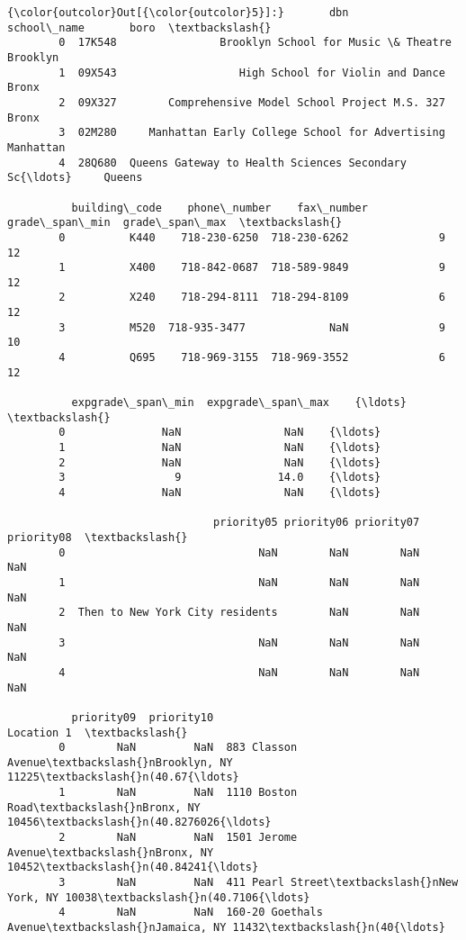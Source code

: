 \documentclass[11pt]{article}
\begin{document}
\begin{Verbatim}[commandchars=\\\{\}]
{\color{outcolor}Out[{\color{outcolor}5}]:}       dbn                                        school\_name       boro  \textbackslash{}
        0  17K548                Brooklyn School for Music \& Theatre   Brooklyn   
        1  09X543                   High School for Violin and Dance      Bronx   
        2  09X327        Comprehensive Model School Project M.S. 327      Bronx   
        3  02M280     Manhattan Early College School for Advertising  Manhattan   
        4  28Q680  Queens Gateway to Health Sciences Secondary Sc{\ldots}     Queens   
        
          building\_code    phone\_number    fax\_number grade\_span\_min  grade\_span\_max  \textbackslash{}
        0          K440    718-230-6250  718-230-6262              9              12   
        1          X400    718-842-0687  718-589-9849              9              12   
        2          X240    718-294-8111  718-294-8109              6              12   
        3          M520  718-935-3477             NaN              9              10   
        4          Q695    718-969-3155  718-969-3552              6              12   
        
          expgrade\_span\_min  expgrade\_span\_max    {\ldots}      \textbackslash{}
        0               NaN                NaN    {\ldots}       
        1               NaN                NaN    {\ldots}       
        2               NaN                NaN    {\ldots}       
        3                 9               14.0    {\ldots}       
        4               NaN                NaN    {\ldots}       
        
                                priority05 priority06 priority07 priority08  \textbackslash{}
        0                              NaN        NaN        NaN        NaN   
        1                              NaN        NaN        NaN        NaN   
        2  Then to New York City residents        NaN        NaN        NaN   
        3                              NaN        NaN        NaN        NaN   
        4                              NaN        NaN        NaN        NaN   
        
          priority09  priority10                                         Location 1  \textbackslash{}
        0        NaN         NaN  883 Classon Avenue\textbackslash{}nBrooklyn, NY 11225\textbackslash{}n(40.67{\ldots}   
        1        NaN         NaN  1110 Boston Road\textbackslash{}nBronx, NY 10456\textbackslash{}n(40.8276026{\ldots}   
        2        NaN         NaN  1501 Jerome Avenue\textbackslash{}nBronx, NY 10452\textbackslash{}n(40.84241{\ldots}   
        3        NaN         NaN  411 Pearl Street\textbackslash{}nNew York, NY 10038\textbackslash{}n(40.7106{\ldots}   
        4        NaN         NaN  160-20 Goethals Avenue\textbackslash{}nJamaica, NY 11432\textbackslash{}n(40{\ldots}   
        

\end{Verbatim}
\end{document}
